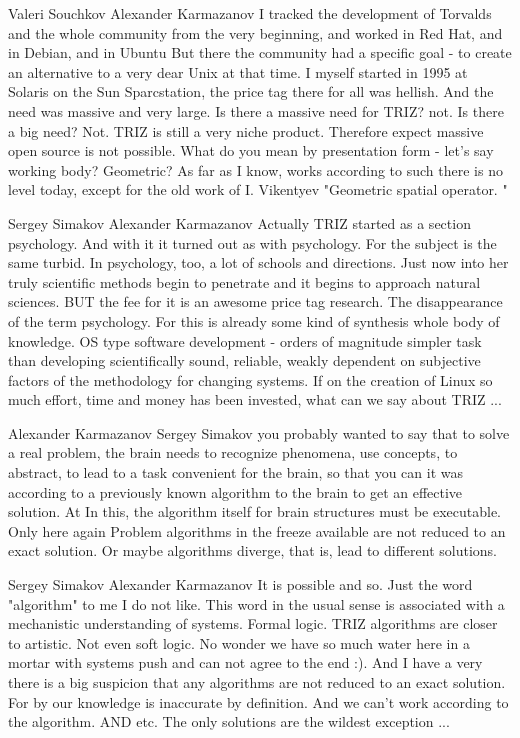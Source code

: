 \documentclass[11pt,a4paper]{article}
\begin{document}
Valeri Souchkov Alexander Karmazanov I tracked the development of Torvalds and
the whole community from the very beginning, and worked in Red Hat, and in
Debian, and in Ubuntu But there the community had a specific goal - to create
an alternative to a very dear Unix at that time. I myself started in 1995 at
Solaris on the Sun Sparcstation, the price tag there for all was hellish. And
the need was massive and very large.  Is there a massive need for TRIZ?
not. Is there a big need? Not.  TRIZ is still a very niche product. Therefore
expect massive open source is not possible. What do you mean by presentation
form - let's say working body? Geometric? As far as I know, works according to
such there is no level today, except for the old work of I. Vikentyev
"Geometric spatial operator. "

Sergey Simakov Alexander Karmazanov Actually TRIZ started as a section
psychology. And with it it turned out as with psychology. For the subject is
the same turbid. In psychology, too, a lot of schools and directions. Just now
into her truly scientific methods begin to penetrate and it begins to approach
natural sciences. BUT the fee for it is an awesome price tag research. The
disappearance of the term psychology. For this is already some kind of
synthesis whole body of knowledge. OS type software development - orders of
magnitude simpler task than developing scientifically sound, reliable, weakly
dependent on subjective factors of the methodology for changing systems. If on
the creation of Linux so much effort, time and money has been invested, what
can we say about TRIZ ...

Alexander Karmazanov Sergey Simakov you probably wanted to say that to solve a
real problem, the brain needs to recognize phenomena, use concepts, to
abstract, to lead to a task convenient for the brain, so that you can it was
according to a previously known algorithm to the brain to get an effective
solution. At In this, the algorithm itself for brain structures must be
executable. Only here again Problem algorithms in the freeze available are not
reduced to an exact solution. Or maybe algorithms diverge, that is, lead to
different solutions.

Sergey Simakov Alexander Karmazanov It is possible and so. Just the word
"algorithm" to me I do not like. This word in the usual sense is associated
with a mechanistic understanding of systems. Formal logic. TRIZ algorithms are
closer to artistic. Not even soft logic. No wonder we have so much water here
in a mortar with systems push and can not agree to the end :). And I have a
very there is a big suspicion that any algorithms are not reduced to an exact
solution. For by our knowledge is inaccurate by definition. And we can’t work
according to the algorithm. AND etc. The only solutions are the wildest
exception ...
\end{document}
